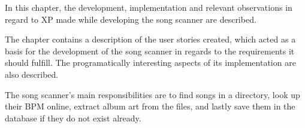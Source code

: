 In this chapter, the development, implementation and relevant observations in regard to XP made while developing the song scanner are described. 

The chapter contains a description of the user stories created, which acted as a basis for the development of the song scanner in regards to the requirements it should fulfill. The programatically interesting aspects of its implementation are also described. 

The song scanner's main responsibilities are to find songs in a directory, look up their BPM online, extract album art from the files, and lastly save them in the database if they do not exist already.